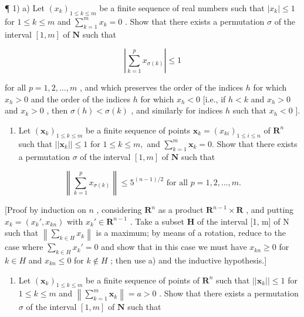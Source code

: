 \ExerciseSection

¶ 1) a) Let \((x_{k})_{1\leqslant k\leqslant m}\) be a finite sequence of real numbers such that \(|x_k|\leqslant 1\) for \(1\leqslant k\leqslant m\) and \(\sum_{k = 1}^{m}x_{k} = 0\) . Show that there exists a permutation \(\sigma\) of the interval \([1,m]\) of \(\mathbf{N}\) such that

\[
\left| \sum_ {k = 1} ^ {p} x _ {\sigma (k)} \right| \leqslant 1
\]

for all \(p = 1, 2, \ldots, m\) , and which preserves the order of the indices \(h\) for which \(x_h > 0\) and the order of the indices \(h\) for which \(x_h < 0\) {[}i.e., if \(h < k\) and \(x_h > 0\) and \(x_k > 0\) , then \(\sigma(h) < \sigma(k)\) , and similarly for indices \(h\) such that \(x_h < 0\) {]}.

\begin{enumerate}
\def\labelenumi{\alph{enumi})}
\setcounter{enumi}{1}
\tightlist
\item
  Let \((\pmb{x}_k)_{1\leqslant k\leqslant m}\) be a finite sequence of points \(\pmb{x}_k = (x_{ki})_{1\leqslant i\leqslant n}\) of \(\mathbf{R}^n\) such that \(||\pmb{x}_k||\leqslant 1\) for \(1\leqslant k\leqslant m,\) and \(\sum_{k = 1}^{m}\pmb{x}_k = 0.\) Show that there exists a permutation \(\sigma\) of the interval \([1, m]\) of \(\mathbf{N}\) such that
\end{enumerate}

\[
\left\| \sum_ {k = 1} ^ {p} x _ {\sigma (k)} \right\| \leqslant 5 ^ {(n - 1) / 2} \text { for   all } p = 1, 2, \dots , m.
\]

{[}Proof by induction on \(n\) , considering \(\mathbf{R}^n\) as a product \(\mathbf{R}^{n-1} \times \mathbf{R}\) , and putting \(x_k = (x_k', x_{kn})\) with \(x_k' \in \mathbf{R}^{n-1}\) . Take a subset \(\mathbf{H}\) of the interval {[}1, m{]} of N such that \(\left\|\sum_{k\in H}x_{k}\right\|\) is a maximum; by means of a rotation, reduce to the case where \(\sum_{k\in H}x_{k}'=0\) and show that in this case we must have \(x_{kn}\geqslant0\) for \(k\in H\) and \(x_{kn}\leqslant0\) for \(k\notin H\) ; then use a) and the inductive hypothesis.{]}

\begin{enumerate}
\def\labelenumi{\alph{enumi})}
\setcounter{enumi}{2}
\tightlist
\item
  Let \((\pmb{x}_k)_{1 \leqslant k \leqslant m}\) be a finite sequence of points of \(\mathbf{R}^n\) such that \(||\pmb{x}_k|| \leqslant 1\) for \(1 \leqslant k \leqslant m\) and \(\left\| \sum_{k=1}^{m} \pmb{x}_k \right\| = a > 0\) . Show that there exists a permutation \(\sigma\) of the interval \([1, m]\) of \(\mathbf{N}\) such that
\end{enumerate}

